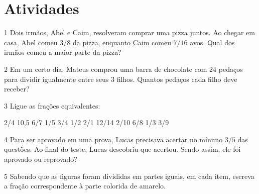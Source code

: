 \section{Atividades}

\num{1}  Dois irmãos, Abel e Caim, resolveram comprar uma pizza juntos. Ao
chegar em casa, Abel comeu $3/8$ da pizza, enquanto Caim comeu $7/16$ avos.
Qual dos irmãos comeu a maior parte da pizza?


\num{2}  Em um certo dia, Mateus comprou uma barra de chocolate com $24$ pedaços
para dividir igualmente entre seus $3$ filhos. Quantos pedaços cada filho
deve receber?



\num{3}  Ligue as frações equivalentes:

\begin{mdframed}[linewidth=2pt,linecolor=azul!20,backgroundcolor=azul!20,roundcorner=2pt]
2/4 \hfill 10,5    
6/7 \hfill 1/5    
3/4 \hfill 1/2    
2/1 \hfill 12/14    
2/10 \hfill 6/8    
1/3 \hfill 3/9    
\end{mdframed}


\num{4}  Para ser aprovado em uma prova, Lucas precisava acertar no mínimo $3/5$
das questões. Ao final do teste, Lucas descobriu que acertou. Sendo
assim, ele foi aprovado ou reprovado?


\num{5}  Sabendo que as figuras foram divididas em partes iguais, em cada
item, escreva a fração correspondente à parte colorida de amarelo.

